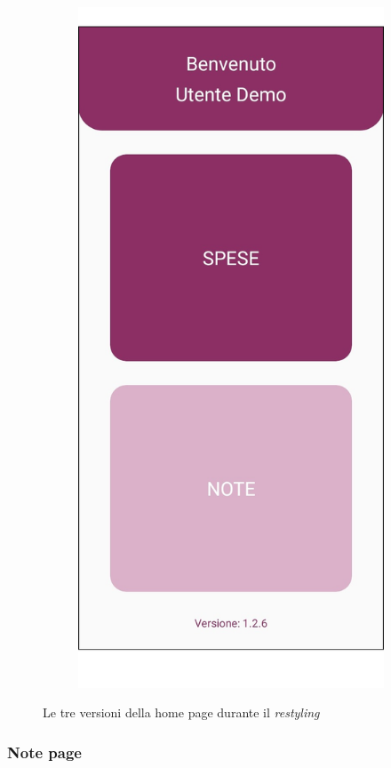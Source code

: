 \begin{figure}[H]
\begin{subfigure}{.5\textwidth}
    \end{subfigure}
    \begin{subfigure}{.5\textwidth}
        \centering
        \includegraphics[width=.7\columnwidth]{images/screenshot/new/home.png}\vspace{2mm}
    \end{subfigure}
    \caption{Le tre versioni della home page durante il \emph{restyling}}
\end{figure}


\subsubsection{Note page}

